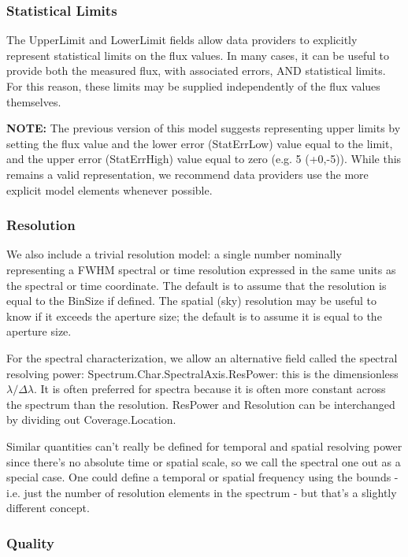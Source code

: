 \documentclass[11pt]{article}
\begin{document}
\subsubsection{Statistical Limits}

The UpperLimit and LowerLimit fields allow data providers to explicitly
represent statistical limits on the flux values.  In many cases, it can
be useful to provide both the measured flux, with associated errors, AND
statistical limits.  For this reason, these limits may be supplied
independently of the flux values themselves.

{\bf NOTE: } The previous version of this model suggests representing upper 
limits by setting the flux value and the lower error (StatErrLow) value 
equal to the limit, and the upper error (StatErrHigh) value equal to
zero (e.g.  5 (+0,-5)).  While this remains a valid representation, we 
recommend data providers use the more explicit model elements whenever possible.


\subsubsection{Resolution}

We also include a trivial resolution model: a single number
nominally representing a FWHM spectral or time resolution expressed in the
same units as the spectral or time coordinate. The default is to assume
that the resolution is equal to the BinSize if defined.
The spatial (sky) resolution may be useful to know if it exceeds the
aperture size; the default is to assume it is equal to the aperture size.

For the spectral characterization, we allow an alternative 
field called the spectral resolving power: Spectrum.Char.SpectralAxis.ResPower:
this is the dimensionless $\lambda/\Delta\lambda$. It is often preferred
for spectra because it is often more constant across the spectrum
than the resolution. 
ResPower and Resolution can be interchanged by dividing out 
Coverage.Location.


Similar quantities can't really be defined for
temporal and spatial resolving power since there's no absolute
time or spatial scale, so we call the spectral one out as a special case.
One could define a temporal or
spatial frequency using the bounds - i.e. just the number
of resolution elements in the spectrum - but that's a slightly
different concept.


\subsubsection{Quality}
  
\end{document}
